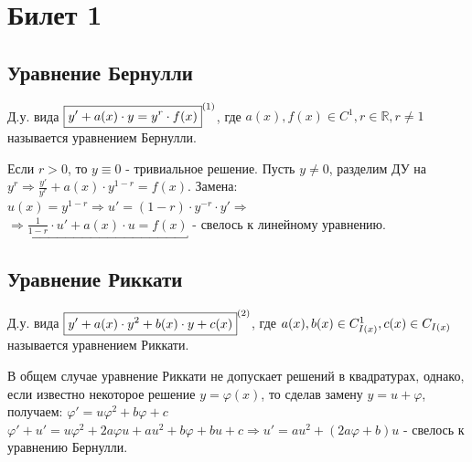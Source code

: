 \section*{Билет 1}
\subsection*{Уравнение Бернулли}

\begin{definition}
	Д.у. вида $ \boxed{y' + a(x)\cdot y = y^r \cdot f(x)}^{\eqnum\label{eq:Ber}} $, где $ a(x), f(x) \in C^1, r \in \mathbb{ R }, r \neq 1$ называется уравнением Бернулли. \\
\end{definition}

\begin{proposition} %
	Если $ r > 0 $, то $ y \equiv 0 $ - тривиальное решение. Пусть $ y \neq 0$, разделим ДУ на $ y^r \Rightarrow \frac{ y' }{ y^r } + a(x) \cdot y^{ 1-r } = f(x).$ Замена: $ u(x) = y^{ 1-r } \Rightarrow u' = ( 1-r ) \cdot y^{ -r } \cdot y' \Rightarrow$ \\ $\Rightarrow \underbracket{ \frac{ 1 }{ 1-r } \cdot u' + a(x)\cdot u = f(x) }$ - свелось к линейному уравнению. 
\end{proposition}

\subsection*{Уравнение Риккати}

\begin{definition}
	Д.у. вида $ \boxed{y' + a(x) \cdot y^2 + b(x) \cdot y + c(x)}^{\eqnum\label{eq:Ric}} $, где $a(x),  b(x) \in C^1_{I(x)},  \\ c(x) \in C_{I(x)}$ называется уравнением Риккати. 
\end{definition}

\begin{proposition}	
	В общем случае уравнение Риккати не допускает решений в квадратурах, однако, если известно некоторое решение $ y = \varphi (x) $, то сделав замену $ y = u + \varphi $, получаем: $ \varphi' = u \varphi^2 + b\varphi + c $ \\ $ \varphi' + u' = u\varphi^2 + 2a\varphi u + au^2 + b\varphi + bu + c \Rightarrow u' = au^2 + (2a\varphi + b)u $ - свелось к уравнению Бернулли.
\end{proposition}

